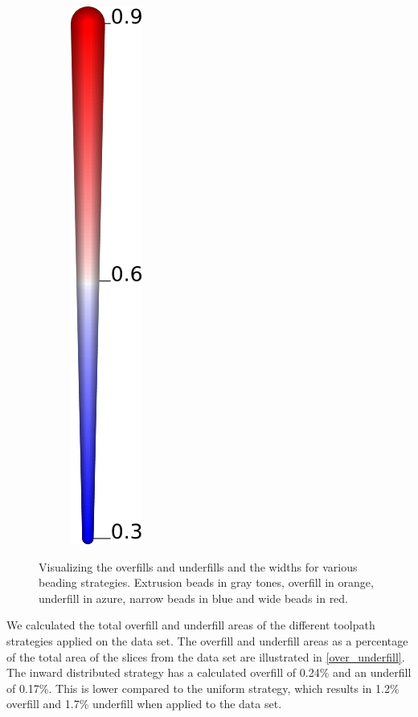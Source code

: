 \begin{figure}
\begin{subfigure}{.04\columnwidth}
\includegraphics[height=\figheight]{sources/validation/gMAT_example/widths_legend.png}
\end{subfigure}
\caption{
Visualizing the overfills and underfills and the widths for various beading strategies.
Extrusion beads in gray tones,
overfill in orange,
underfill in azure,
narrow beads in blue
and wide beads in red.
}
\label{visualized_accuracy}
\end{figure}


We calculated the total overfill and underfill areas of the different toolpath strategies applied on the data set. 
The overfill and underfill areas as a percentage of the total area of the slices from the data set are illustrated in \cref{over_underfill}.  
The inward distributed strategy has a calculated overfill of 0.24\% and an underfill of 0.17\%.
This is lower compared to the uniform strategy, which results in 1.2\% overfill and 1.7\% underfill when applied to the data set.

